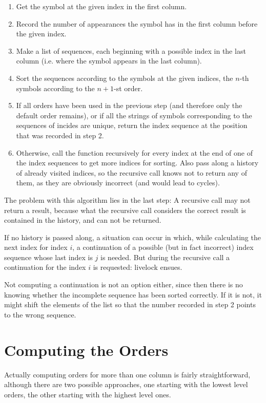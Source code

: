 \documentclass[a4paper]{scrreprt}
\begin{document}
\begin{enumerate}
  \item Get the symbol at the given index in the first column.
  \item Record the number of appearances the symbol has in the first column
  before the given index.
  \item Make a list of sequences, each beginning with a possible index in the
  last column (i.e. where the symbol appears in the last column).
  \item Sort the sequences according to the symbols at the given indices, the
  \(n\)-th symbols according to the \(n + 1\)-st order.
  \item If all orders have been used in the previous step (and therefore only
  the default order remains), or if all the strings of symbols corresponding to
  the sequences of incides are unique, return the index sequence at the position
  that was recorded in step 2.
  \item Otherwise, call the function recursively for every index at the end of
  one of the index sequences to get more indices for sorting. Also pass along a
  history of already visited indices, so the recursive call knows not to return
  any of them, as they are obviously incorrect (and would lead to cycles).
\end{enumerate}

The problem with this algorithm lies in the last step: A recursive call may not
return a result, because what the recursive call considers the correct result is
contained in the history, and can not be returned.

If no history is passed along, a situation can occur in which, while calculating
the next index for index \(i\), a continuation of a possible (but in fact
incorrect) index sequence whose last index is \(j\) is needed. But during the
recursive call a continuation for the index \(i\) is requested: livelock ensues.

Not computing a continuation is not an option either, since then there is no
knowing whether the incomplete sequence has been sorted correctly. If it is not,
it might shift the elements of the list so that the number recorded in step 2
points to the wrong sequence.

\section{Computing the Orders}

Actually computing orders for more than one column is fairly straightforward,
although there are two possible approaches, one starting with the lowest level
orders, the other starting with the highest level ones.
\end{document}
